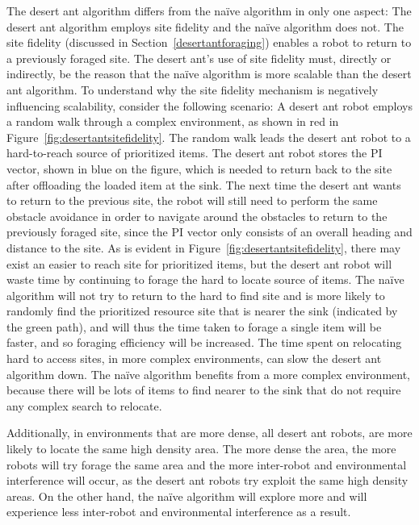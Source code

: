 The desert ant algorithm differs from the na\"ive algorithm in only one aspect: The desert ant algorithm employs site fidelity and the na\"ive algorithm does not. The site fidelity (discussed in Section~\ref{desertantforaging}) enables a robot to return to a previously foraged site. The desert ant's use of site fidelity must, directly or indirectly, be the reason that the na\"ive algorithm is more scalable than the desert ant algorithm. To understand why the site fidelity mechanism is negatively influencing scalability, consider the following scenario: A desert ant robot employs a random walk through a complex environment, as shown in red in Figure~\ref{fig:desertantsitefidelity}. The random walk leads the desert ant robot to a hard-to-reach source of prioritized items. The desert ant robot stores the PI vector, shown in blue on the figure, which is needed to return back to the site after offloading the loaded item at the sink. The next time the desert ant wants to return to the previous site, the robot will still need to perform the same obstacle avoidance in order to navigate around the obstacles to return to the previously foraged site, since the PI vector only consists of an overall heading and distance to the site. As is evident in Figure~\ref{fig:desertantsitefidelity}, there may exist an easier to reach site for prioritized items, but the desert ant robot will waste time by continuing to forage the hard to locate source of items. The na\"ive algorithm will not try to return to the hard to find site and is more likely to randomly find the prioritized resource site that is nearer the sink (indicated by the green path), and will thus the time taken to forage a single item will be faster, and so foraging efficiency will be increased. The time spent on relocating hard to access sites, in more complex environments, can slow the desert ant algorithm down. The na\"ive algorithm benefits from a more complex environment, because there will be lots of items to find nearer to the sink that do not require any complex search to relocate. 

Additionally, in environments that are more dense, all desert ant robots, are more likely to locate the same high density area. The more dense the area, the more robots will try forage the same area and the more inter-robot and environmental interference will occur, as the desert ant robots try exploit the same high density areas. On the other hand, the na\"ive algorithm will explore more and will experience less inter-robot and environmental interference as a result. 


